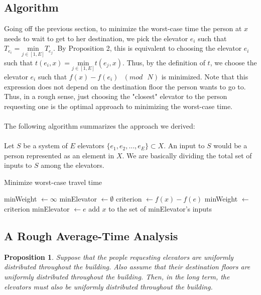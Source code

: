 \documentclass[letterpaper]{article} %
\newtheorem{prop}{Proposition}
\begin{document}
\subsection{Algorithm}
Going off the previous section, to minimize the worst-case time the person at $x$ needs to wait to get to her destination, we pick the elevator $e_i$ such that $T_{e_i} = \underset{j \in [1, E]}{\mathrm{min}} T_{e_j}$. By Proposition 2, this is equivalent to choosing the elevator $e_i$ such that $t(e_i, x) = \underset{j \in [1, E]}{\mathrm{min}} t(e_j, x)$. Thus, by the definition of $t$, we choose the elevator $e_i$ such that $f(x) - f(e_i) \text{ } (mod \text{ } N)$ is minimized. Note that this expression does not depend on the destination floor the person wants to go to. Thus, in a rough sense, just choosing the "closest" elevator to the person requesting one is the optimal approach to minimizing the worst-case time. \\\\
The following algorithm summarizes the approach we derived:\\\\
Let $S$ be a system of $E$ elevators $\{e_1, e_2, ... , e_E\} \subset X$. An input to $S$ would be a person represented as an element in $X$. We are basically dividing the total set of inputs to $S$ among the elevators.\\
\begin{algorithm}
\caption{Minimize worst-case travel time}\label{euclid}
\begin{algorithmic}[1]
	\State minWeight $\leftarrow \infty$
	\State minElevator $\leftarrow \emptyset$
		\State criterion $\leftarrow f(x) - f(e)$
			\State minWeight $\leftarrow$ criterion
			\State minElevator $\leftarrow e$
		\EndIf
	\EndFor
	\State add $x$ to the set of minElevator's inputs
\EndFor
\EndProcedure
\end{algorithmic}
\end{algorithm}

\subsection{A Rough Average-Time Analysis}
\begin{prop}
	Suppose that the people requesting elevators are uniformly distributed throughout the building. Also assume that their destination floors are uniformly distributed throughout the building. Then, in the long term, the elevators must also be uniformly distributed throughout the building. 
\end{prop}
\end{document}
